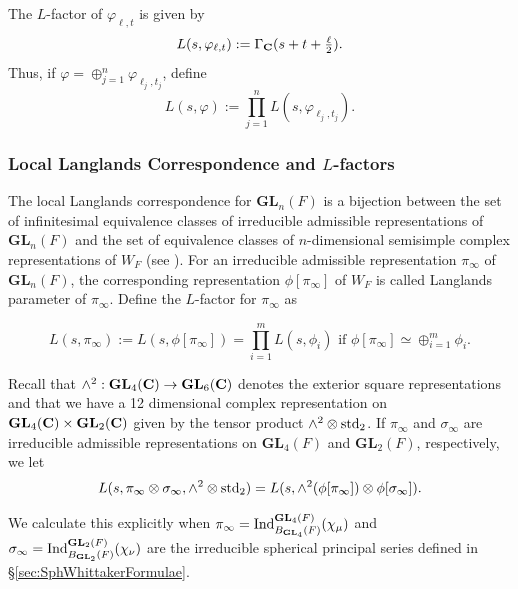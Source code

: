 \documentclass[11pt, reqno]{amsart}
\theoremstyle{plain}
\theoremstyle{definition}
\theoremstyle{remark}
\theoremstyle{plain}
\def\C{{\bf C}}
\def\GL{\mathbf{GL}}
\begin{document}
The $L$-factor of $\varphi_{\ell,t}$ is given by $$L(s,\varphi_{\ell,t}) := \Gamma_\C(s+ t + \tfrac{\ell}{2}).$$ 
Thus, if $\varphi = \oplus_{j=1}^n\varphi_{\ell_j,t_j}$, define 
$$L(s,\varphi) := \prod_{j=1}^nL(s,\varphi_{\ell_j,t_j}).$$

\subsubsection{Local Langlands Correspondence and $L$-factors}


The local Langlands correspondence for $\GL_n(F)$ is a bijection between the set of infinitesimal equivalence classes of irreducible admissible representations of $\GL_n(F)$ and the set of equivalence classes of $n$-dimensional semisimple complex representations of $W_F$ (see \cite[Theorems 2 \& 5]{KnappLLCA}). For an irreducible admissible representation $\pi_\infty$ of $\GL_n(F)$, the corresponding representation  $\phi[\pi_\infty]$ of $W_F$ is called Langlands parameter of $\pi_\infty$. Define the $L$-factor for $\pi_\infty$ as

$$ L(s,\pi_\infty) := L(s, \phi[\pi_\infty]) =  \prod_{i=1}^m L(s, \phi_i) \text{ if } \phi[\pi_\infty] \simeq \oplus_{i=1}^m \phi_i.$$

Recall that $\wedge^2:\GL_4(\C) \to \GL_6(\C)$ denotes the exterior square representations and that we have a 12 dimensional complex representation on $\GL_4(\C)\times \GL_2(\C)$ given by the tensor product $\wedge^2 \otimes {\rm std}_2$. If $\pi_\infty$ and $\sigma_\infty$ are irreducible admissible representations on $\GL_4(F)$ and $\GL_2(F)$, respectively, we let $$L(s, \pi_\infty \otimes \sigma_\infty, \wedge^2 \otimes {\rm std}_2) = L(s, \wedge^2(\phi[\pi_\infty]) \otimes \phi[\sigma_\infty]).$$

\noindent We calculate this explicitly when $\pi_\infty = {\rm Ind}_{B_{\GL_4}(F)}^{\GL_4(F)}(\chi_{\mu})$ and $\sigma_\infty = {\rm Ind}_{B_{\GL_2}(F)}^{\GL_2(F)}(\chi_{\nu})$ are the irreducible spherical principal series defined in \S \ref{sec:SphWhittakerFormulae}. 
\end{document}
